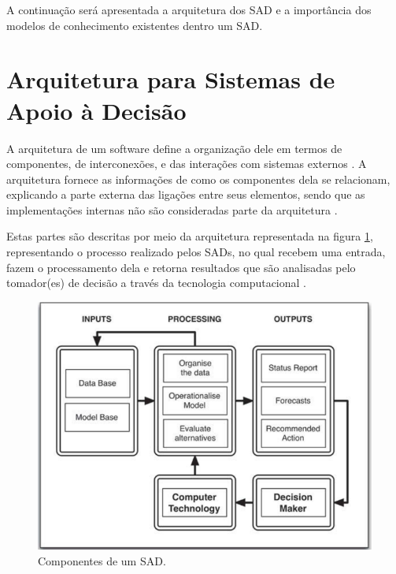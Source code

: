 A continuação será apresentada a arquitetura dos SAD e a importância
dos modelos de conhecimento existentes dentro um SAD. 

\section{Arquitetura para Sistemas de Apoio à Decisão}

A arquitetura de um software define a organização dele em termos de
componentes, de interconexões, e das interações com sistemas externos
\citep{de1997software}. A arquitetura fornece as informações de como
os componentes dela se relacionam, explicando a parte externa das
ligações entre seus elementos, sendo que as implementações internas
não são consideradas parte da arquitetura \citep{sei2006architecture}.

Estas partes são descritas por meio da arquitetura representada na
figura \ref{fig:Componentes-SAD}, representando o processo realizado
pelos SADs, no qual recebem uma entrada, fazem o processamento dela
e retorna resultados que são analisadas pelo tomador(es) de decisão
a través da tecnologia computacional \citep{Tweedale2016}. 

\begin{figure}[H]
\noindent \begin{centering}
\includegraphics[width=0.8\columnwidth]{figures/DSS}
\par\end{centering}
\caption{Componentes de um SAD.\label{fig:Componentes-SAD} }

\end{figure}

